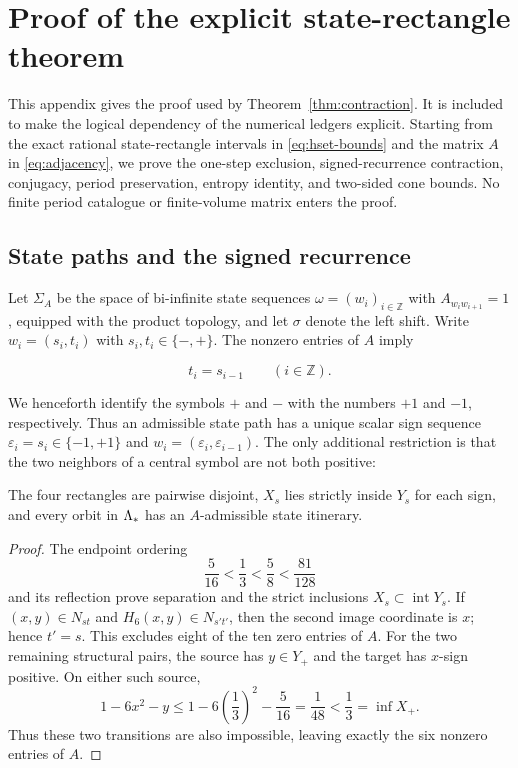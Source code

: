 \section{Proof of the explicit state-rectangle theorem}
\label{app:contraction-proof}

This appendix gives the proof used by Theorem~\ref{thm:contraction}.  It is
included to make the logical dependency of the numerical ledgers explicit.
Starting from the exact rational state-rectangle intervals in
\eqref{eq:hset-bounds} and
the matrix $A$ in \eqref{eq:adjacency}, we prove the one-step exclusion,
signed-recurrence contraction, conjugacy, period preservation, entropy identity,
and two-sided cone bounds.  No finite period catalogue or finite-volume matrix
enters the proof.

\subsection{State paths and the signed recurrence}

Let $\Sigma_A$ be the space of bi-infinite state sequences
$\omega=(w_i)_{i\in\mathbb Z}$ with $A_{w_iw_{i+1}}=1$, equipped with the
product topology, and let $\sigma$ denote the left shift.  Write
$w_i=(s_i,t_i)$ with $s_i,t_i\in\{-,+\}$.  The nonzero entries of $A$ imply

\begin{equation}
 t_i=s_{i-1}\qquad (i\in\mathbb Z).
 \label{eq:proof-state-overlap}
\end{equation}

We henceforth identify the symbols $+$ and $-$ with the numbers $+1$ and
$-1$, respectively.  Thus an admissible state path has a unique scalar sign
sequence $\varepsilon_i=s_i\in\{-1,+1\}$ and
$w_i=(\varepsilon_i,\varepsilon_{i-1})$.  The only additional restriction is
that the two neighbors of a central symbol are not both positive:

\begin{lemma}
\label{lem:proof-exclusion}
The four rectangles are pairwise disjoint, $X_s$ lies strictly inside $Y_s$
for each sign, and every orbit in $\Lambda_*$ has an $A$-admissible state
itinerary.
\end{lemma}

\begin{proof}
The endpoint ordering
\[
 \frac5{16}<\frac13<\frac58<\frac{81}{128}
\]
and its reflection prove separation and the strict inclusions
$X_s\subset\operatorname{int}Y_s$.  If $(x,y)\in N_{st}$ and
$H_6(x,y)\in N_{s't'}$, then the second image coordinate is $x$; hence
$t'=s$.  This excludes eight of the ten zero entries of $A$.  For the two
remaining structural pairs, the source has $y\in Y_+$ and the target has
$x$-sign positive.  On either such source,
\[
 1-6x^2-y
 \leq 1-6\left(\frac13\right)^2-\frac5{16}
 =\frac1{48}<\frac13=\inf X_+.
\]
Thus these two transitions are also impossible, leaving exactly the six
nonzero entries of $A$.
\end{proof}

